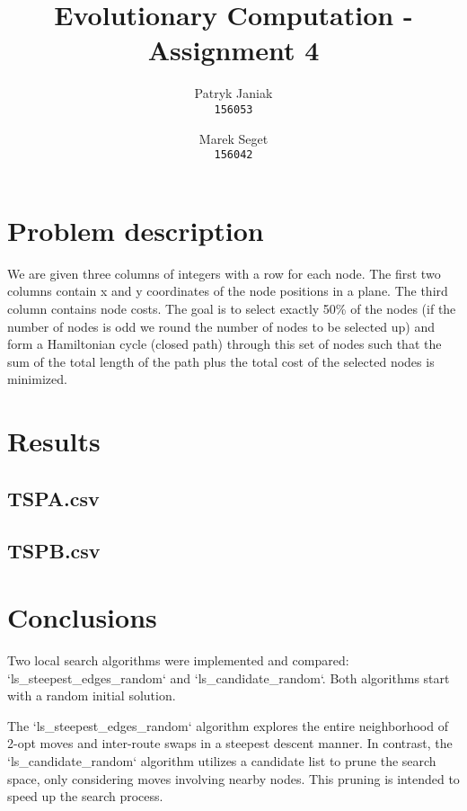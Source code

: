 \documentclass{article}
\title{Evolutionary Computation - Assignment 4}
\author{
  Patryk Janiak\\
  \texttt{156053}
  \and
  Marek Seget\\
  \texttt{156042}
}
\begin{document}
\maketitle

\section{Problem description}
We are given three columns of integers with a row for each node. The first two columns contain x
and y coordinates of the node positions in a plane. The third column contains node costs. The goal is
to select exactly 50\% of the nodes (if the number of nodes is odd we round the number of nodes to
be selected up) and form a Hamiltonian cycle (closed path) through this set of nodes such that the
sum of the total length of the path plus the total cost of the selected nodes is minimized.



\section{Results}





\subsection{TSPA.csv}



\subsection{TSPB.csv}



\newpage

\section{Conclusions}

Two local search algorithms were implemented and compared: `ls\_steepest\_edges\_random` and `ls\_candidate\_random`. Both algorithms start with a random initial solution.

The `ls\_steepest\_edges\_random` algorithm explores the entire neighborhood of 2-opt moves and inter-route swaps in a steepest descent manner. In contrast, the `ls\_candidate\_random` algorithm utilizes a candidate list to prune the search space, only considering moves involving nearby nodes. This pruning is intended to speed up the search process.
\end{document}
